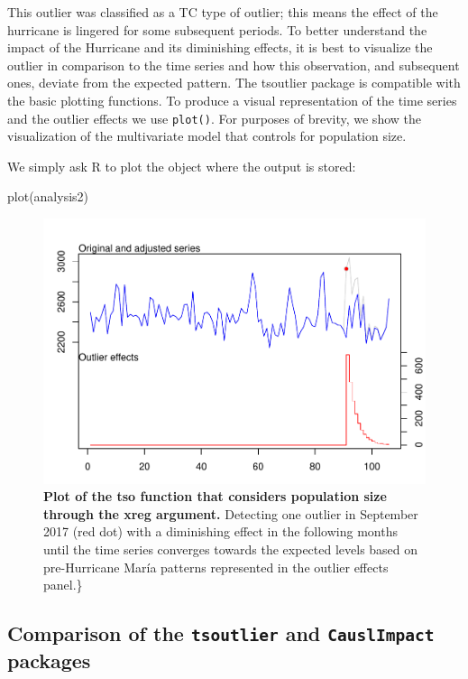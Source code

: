\documentclass[12pt]{article}
\newenvironment{Shaded}{\begin{snugshade}}{\end{snugshade}}
\newcommand{\FunctionTok}[1]{\textcolor[rgb]{0.00,0.00,0.00}{#1}}
\newcommand{\NormalTok}[1]{#1}
\begin{document}
This outlier was classified as a TC type of outlier; this means the
effect of the hurricane is lingered for some subsequent periods. To
better understand the impact of the Hurricane and its diminishing
effects, it is best to visualize the outlier in comparison to the time
series and how this observation, and subsequent ones, deviate from the
expected pattern. The tsoutlier package is compatible with the basic
plotting functions. To produce a visual representation of the time
series and the outlier effects we use \texttt{plot()}. For purposes of
brevity, we show the visualization of the multivariate model that
controls for population size.

We simply ask R to plot the object where the output is stored:

\begin{Shaded}
\begin{Highlighting}[]
\FunctionTok{plot}\NormalTok{(analysis2)}
\end{Highlighting}
\end{Shaded}

\begin{figure}
\centering
\includegraphics{MainDocument_files/figure-latex/unnamed-chunk-13-1.pdf}
\caption{\textbf{Plot of the tso function that considers population size through the xreg argument.}
Detecting one outlier in September 2017 (red dot) with a diminishing
effect in the following months until the time series converges towards
the expected levels based on pre-Hurricane María patterns represented in
the outlier effects panel.\} \label{tso-plot}}
\end{figure}

\hypertarget{comparison-of-the-tsoutlier-and-causlimpact-packages}{%
\subsection{\texorpdfstring{Comparison of the \texttt{tsoutlier} and
\texttt{CauslImpact}
packages}{Comparison of the tsoutlier and CauslImpact packages}}\label{comparison-of-the-tsoutlier-and-causlimpact-packages}}
\end{document}
